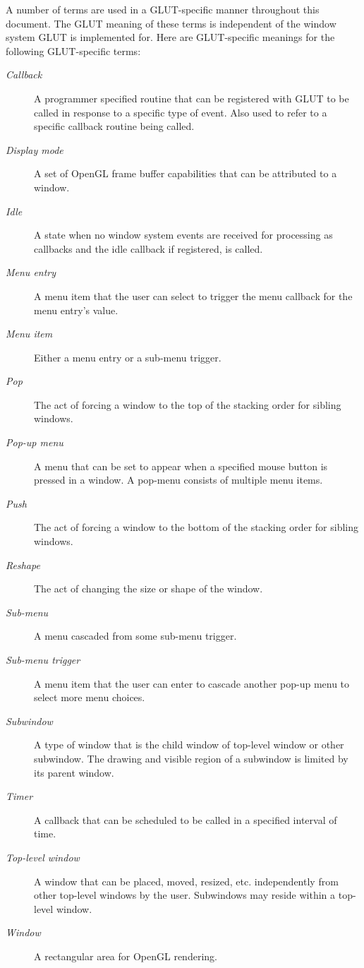 A number of terms are used in a GLUT-specific manner throughout this
document.  The GLUT meaning of these terms is independent of the
window system GLUT is implemented for.  Here are GLUT-specific
meanings for the following GLUT-specific terms:
\begin{description}
\item[\em Callback]  A programmer specified routine that can be
registered with GLUT to be called in response to a specific type
of event.  Also used to refer to a specific callback routine
being called.
\item[\em Display mode]  A set of OpenGL frame buffer capabilities
that can be attributed to a window.
\item[\em Idle]  A state when no window system events are received
for processing as callbacks and the idle callback if registered,
is called.
\item[\em Menu entry]  A menu item that the user can select to
trigger the menu callback for the menu entry's value.
\item[\em Menu item]  Either a menu entry or a sub-menu trigger.
\item[\em Pop]  The act of forcing a window to the top of the
stacking order for sibling windows.
\item[\em Pop-up menu]  A menu that can be set to appear when a specified
mouse button is pressed in a window.  A pop-menu consists of multiple
menu items.
\item[\em Push]  The act of forcing a window to the bottom of the
stacking order for sibling windows.
\item[\em Reshape]  The act of changing the size or shape of the window.
\item[\em Sub-menu]  A menu cascaded from some sub-menu trigger.
\item[\em Sub-menu trigger]  A menu item that the user can enter to
cascade another pop-up menu to select more menu choices.
\item[\em Subwindow]  A type of window that is the child window of
top-level window or other subwindow.  The drawing and visible region
of a subwindow is limited by its parent window.
\item[\em Timer]  A callback that can be scheduled to be called in
a specified interval of time.
\item[\em Top-level window]  A window that can be placed, moved, resized,
etc. independently from other top-level windows by the user.
Subwindows may reside within a top-level window.
\item[\em Window]  A rectangular area for OpenGL rendering.

\end{description}
